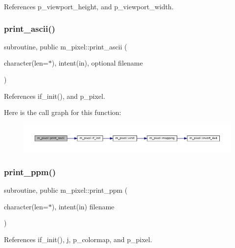 References p\+\_\+viewport\+\_\+height, and p\+\_\+viewport\+\_\+width.

\mbox{\label{namespacem__pixel_ab2bb47aea567667b1b92c8265bcb36fb}} 
\subsubsection{\texorpdfstring{print\+\_\+ascii()}{print\_ascii()}}
{\footnotesize\ttfamily subroutine, public m\+\_\+pixel\+::print\+\_\+ascii (\begin{DoxyParamCaption}\item[{character(len=$\ast$), intent(in), optional}]{filename }\end{DoxyParamCaption})}



References if\+\_\+init(), and p\+\_\+pixel.

Here is the call graph for this function\+:
\nopagebreak
\begin{figure}[H]
\begin{center}
\leavevmode
\includegraphics[width=350pt]{namespacem__pixel_ab2bb47aea567667b1b92c8265bcb36fb_cgraph}
\end{center}
\end{figure}
\mbox{\label{namespacem__pixel_a01797b04ce7c693c3fd6a841e8d1de48}} 
\subsubsection{\texorpdfstring{print\+\_\+ppm()}{print\_ppm()}}
{\footnotesize\ttfamily subroutine, public m\+\_\+pixel\+::print\+\_\+ppm (\begin{DoxyParamCaption}\item[{character(len=$\ast$), intent(in)}]{filename }\end{DoxyParamCaption})}



References if\+\_\+init(), j, p\+\_\+colormap, and p\+\_\+pixel.

